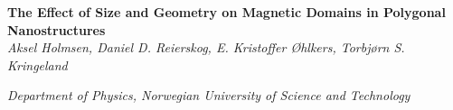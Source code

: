 
\begin{center}
{ \LARGE \bfseries The Effect of Size and Geometry on Magnetic Domains in Polygonal Nanostructures}\\[0.3cm]

\normalsize
\emph{Aksel Holmsen, Daniel D. Reierskog, E. Kristoffer Øhlkers, Torbjørn S. Kringeland}

\small
\emph{Department of Physics, Norwegian University of Science and Technology}

\end{center}